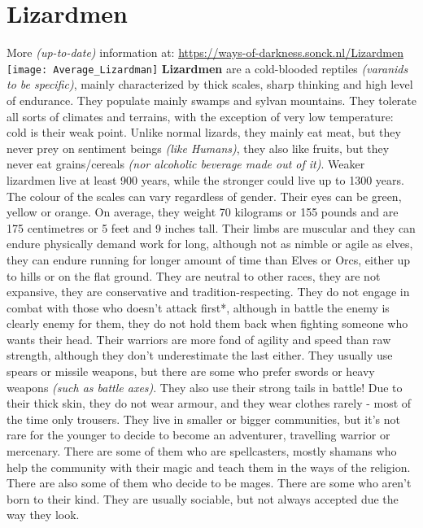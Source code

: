\documentclass[openany,10pt,a4paper]{book}
\begin{document}
\section{Lizardmen}
More \textit{(up-to-date)} information at: \url{https://ways-of-darkness.sonck.nl/Lizardmen}\newline
\texttt{[image: Average\_Lizardman]}\newline
\textbf{Lizardmen} are a cold-blooded reptiles \textit{(varanids to be specific)}, mainly characterized by thick scales, sharp thinking and high level of endurance. They populate mainly swamps and sylvan mountains. They tolerate all sorts of climates and terrains, with the exception of very low temperature: cold is their weak point. Unlike normal lizards, they mainly eat meat, but they never prey on sentiment beings \textit{(like Humans)}, they also like fruits, but they never eat grains/cereals \textit{(nor alcoholic beverage made out of it)}. Weaker lizardmen live at least 900 years, while the stronger could live up to 1300 years. The colour of the scales can vary regardless of gender. Their eyes can be green, yellow or orange. On average, they weight 70 kilograms or 155 pounds and are 175 centimetres or 5 feet and 9 inches tall.\newline
Their limbs are muscular and they can endure physically demand work for long, although not as nimble or agile as elves, they can endure running for longer amount of time than Elves or Orcs, either up to hills or on the flat ground. They are neutral to other races, they are not expansive, they are conservative and tradition-respecting. They do not engage in combat with those who doesn't attack first*, although in battle the enemy is clearly enemy for them, they do not hold them back when fighting someone who wants their head. Their warriors are more fond of agility and speed than raw strength, although they don’t underestimate the last either. They usually use spears or missile weapons, but there are some who prefer swords or heavy weapons \textit{(such as battle axes)}. They also use their strong tails in battle! Due to their thick skin, they do not wear armour, and they wear clothes rarely - most of the time only trousers.\newline
They live in smaller or bigger communities, but it’s not rare for the younger to decide to become an adventurer, travelling warrior or mercenary. There are some of them who are spellcasters, mostly shamans who help the community with their magic and teach them in the ways of the religion. There are also some of them who decide to be mages. There are some who aren’t born to their kind. They are usually sociable, but not always accepted due the way they look.\newline
\end{document}
